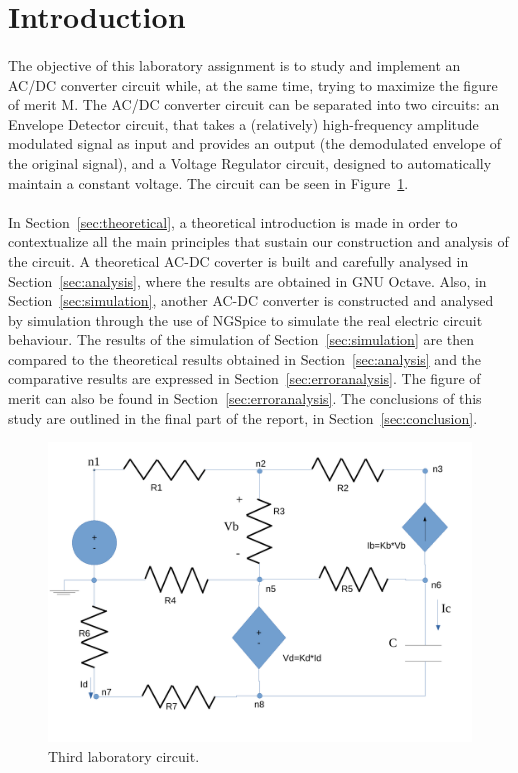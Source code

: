 \section{Introduction}
\label{sec:introduction}

\paragraph{} 
The objective of this laboratory assignment is to study and implement an AC/DC converter circuit while, at the same time, trying to maximize the figure of merit M. The AC/DC converter circuit can be separated into two circuits: an Envelope Detector circuit, that takes a (relatively) high-frequency amplitude modulated signal as input and provides an output (the demodulated envelope of the original signal), and a Voltage Regulator circuit, designed to automatically maintain a constant voltage. The circuit can be seen in Figure~\ref{fig:circuit}.

\paragraph{}
In Section~\ref{sec:theoretical}, a theoretical introduction is made in order to contextualize all the main principles that sustain our construction and analysis of the circuit. A theoretical AC-DC coverter is built and carefully analysed in Section~\ref{sec:analysis}, where the results are obtained in GNU Octave. Also, in Section~\ref{sec:simulation}, another AC-DC converter is constructed and analysed by simulation through the use of NGSpice to simulate the real electric circuit behaviour. The results of the simulation of Section~\ref{sec:simulation} are then compared to the theoretical results obtained in Section~\ref{sec:analysis} and the comparative results are expressed in Section~\ref{sec:erroranalysis}. The figure of merit can also be found in Section~\ref{sec:erroranalysis}. The conclusions of this study are outlined in the final part of the report, in Section~\ref{sec:conclusion}.


\begin{figure}[h] \centering
\includegraphics[width=0.4\linewidth]{circuit.pdf}
\caption{Third laboratory circuit.}
\label{fig:circuit}
\end{figure}

